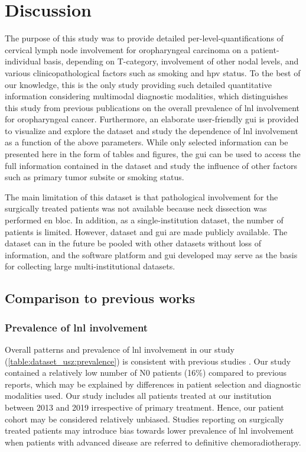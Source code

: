 \documentclass[\relativeRoot/main.tex]{subfiles}
\begin{document}
\section{Discussion}
\label{sec:dataset_usz:discussion}

The purpose of this study was to provide detailed per-level-quantifications of cervical lymph node involvement for oropharyngeal carcinoma on a patient-individual basis, depending on T-category, involvement of other nodal levels, and various clinicopathological factors such as smoking and \gls{hpv} status. To the best of our knowledge, this is the only study providing such detailed quantitative information considering multimodal diagnostic modalities, which distinguishes this study from previous publications on the overall prevalence of \gls{lnl} involvement for oropharyngeal cancer. Furthermore, an elaborate user-friendly \gls{gui} is provided to visualize and explore the dataset and study the dependence of \gls{lnl} involvement as a function of the above parameters. While only selected information can be presented here in the form of tables and figures, the \gls{gui} can be used to access the full information contained in the dataset and study the influence of other factors such as primary tumor subsite or smoking status.

The main limitation of this dataset is that pathological involvement for the surgically treated patients was not available because neck dissection was performed en bloc. In addition, as a single-institution dataset, the number of patients is limited. However, dataset and \gls{gui} are made publicly available. The dataset can in the future be pooled with other datasets without loss of information, and the software platform and \gls{gui} developed may serve as the basis for collecting large multi-institutional datasets.

\subsection*{Comparison to previous works}

\subsubsection*{Prevalence of \gls{lnl} involvement}

Overall patterns and prevalence of \gls{lnl} involvement in our study (\cref{table:dataset_usz:prevalence}) is consistent with previous studies \cite{candela_patterns_1990,gregoire_selection_2000,iyizoba-ebozue_retropharyngeal_2020}. Our study contained a relatively low number of N0 patients (16\%) compared to previous reports, which may be explained by differences in patient selection and diagnostic modalities used. Our study includes all patients treated at our institution between 2013 and 2019 irrespective of primary treatment. Hence, our patient cohort may be considered relatively unbiased. Studies reporting on surgically treated patients may introduce bias towards lower prevalence of \gls{lnl} involvement when patients with advanced disease are referred to definitive chemoradiotherapy.
\end{document}
